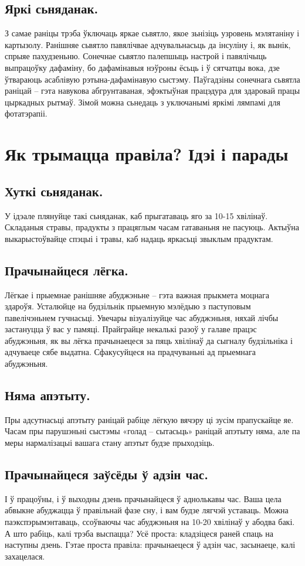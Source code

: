 \subsection{Яркі сьняданак.}
З самае раніцы трэба ўключаць яркае сьвятло, якое зьнізіць узровень мэлятаніну і картызолу. Ранішняе сьвятло павялічвае адчувальнасьць да інсуліну і, як вынік, спрыяе пахудзеньню. Сонечнае сьвятло палепшыць настрой і павялічыць выпрацоўку дафаміну, бо дафамінавыя нэўроны ёсьць і ў сятчатцы вока, дзе ўтвараюць асаблівую рэтына-дафамінавую сыстэму. Паўгадзіны сонечнага сьвятла раніцай – гэта навукова абгрунтаваная, эфэктыўная працэдура для здаровай працы цыркадных рытмаў. Зімой можна сьнедаць з уключанымі яркімі лямпамі для фотатэрапіі.

\section{Як трымацца правіла? Ідэі і парады}

\subsection{Хуткі сьняданак.}
У ідэале плянуйце такі сьняданак, каб прыгатаваць яго за 10-15 хвілінаў. Складаныя стравы, прадукты з працяглым часам гатаваньня не пасуюць. Актыўна выкарыстоўвайце спэцыі і травы, каб надаць яркасьці звыклым прадуктам.

\subsection{Прачынайцеся лёгка.}
Лёгкае і прыемнае ранішняе абуджэньне – гэта важная прыкмета моцнага здароўя. Усталюйце на будзільнік прыемную мэлёдыю з паступовым павелічэньнем гучнасьці. Увечары візуалізуйце час абуджэньня, няхай лічбы застануцца ў вас у памяці. Прайграйце некалькі разоў у галаве працэс абуджэньня, як вы лёгка прачынаецеся за пяць хвілінаў да сыгналу будзільніка і адчуваеце сябе выдатна. Сфакусуйцеся на прадчуваньні ад прыемнага абуджэньня.

\subsection{Няма апэтыту.}
Пры адсутнасьці апэтыту раніцай рабіце лёгкую вячэру ці зусім прапускайце яе. Часам пры парушэньні сыстэмы «голад – сытасьць» раніцай апэтыту няма, але па меры нармалізацыі вашага стану апэтыт будзе прыходзіць.

\subsection{Прачынайцеся заўсёды ў адзін час.}
І ў працоўны, і ў выходны дзень прачынайцеся ў аднолькавы час. Ваша цела абвыкне абуджацца ў правільнай фазе сну, і вам будзе лягчэй уставаць. Можна паэкспэрымэнтаваць, ссоўваючы час абуджэньня на 10-20 хвілінаў у абодва бакі. А што рабіць, калі трэба выспацца? Усё проста: кладзіцеся раней спаць на наступны дзень. Гэтае проста правіла: прачынаецеся ў адзін час, засынаеце, калі захацелася.

